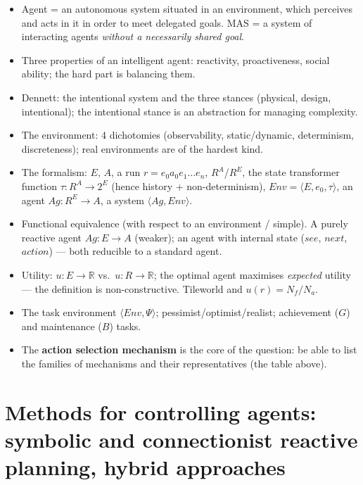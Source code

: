 \documentclass[11pt,a4paper]{article}
\theoremstyle{definition}
\begin{document}
\begin{itemize}
\item Agent = an autonomous system situated in an environment, which perceives and acts in it in
  order to meet delegated goals. MAS = a system of interacting agents \emph{without a necessarily
  shared goal}.
\item Three properties of an intelligent agent: reactivity, proactiveness, social ability;
  the hard part is balancing them.
\item Dennett: the intentional system and the three stances (physical, design, intentional);
  the intentional stance is an abstraction for managing complexity.
\item The environment: 4 dichotomies (observability, static/dynamic, determinism, discreteness);
  real environments are of the hardest kind.
\item The formalism: $E$, $A$, a run $r = e_0 a_0 e_1 \dots e_n$, $R^A$/$R^E$,
  the state transformer function $\tau : R^A \to 2^E$ (hence history + non-determinism),
  $\mathit{Env}=\langle E,e_0,\tau\rangle$, an agent $Ag : R^E \to A$, a system
  $\langle Ag,\mathit{Env}\rangle$.
\item Functional equivalence (with respect to an environment / simple). A purely reactive agent
  $Ag: E \to A$ (weaker); an agent with internal state ($\mathit{see}$, $\mathit{next}$,
  $\mathit{action}$) --- both reducible to a standard agent.
\item Utility: $u : E \to \mathbb{R}$ vs.\ $u : R \to \mathbb{R}$; the optimal agent maximises
  \emph{expected} utility --- the definition is non-constructive. Tileworld and $u(r)=N_f/N_a$.
\item The task environment $\langle \mathit{Env}, \Psi\rangle$; pessimist/optimist/realist;
  achievement ($G$) and maintenance ($B$) tasks.
\item The \textbf{action selection mechanism} is the core of the question: be able to list the
  families of mechanisms and their representatives (the table above).
\end{itemize}

\section{Methods for controlling agents: symbolic and connectionist reactive
planning, hybrid approaches}
\label{sec:rizeni}
\end{document}
